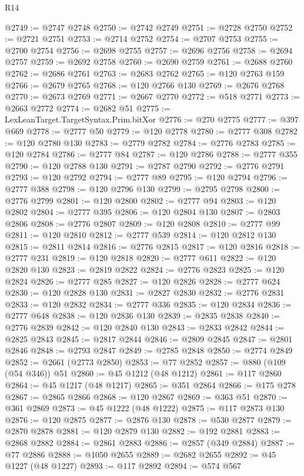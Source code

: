 \begin{lexlean}{R14}
\begin{coremodule}
{{{{{{{{{{{{{{{{{{{{{{{{{{{{{{{{{{{{{{{{{{{{{{{{{{{{{{{{{{{{{{{{{{{{{{{{{{{{{{{{{{{{{{{{{{{{{{{{{{{{{{{{{{@2749 := @2747 @2748
@2750 := @2742 @2749
@2751 := @2728 @2750
@2752 := @2721 @2751
@2753 := @2714 @2752
@2754 := @2707 @2753
@2755 := @2700 @2754
@2756 := @2698 @2755
@2757 := @2696 @2756
@2758 := @2694 @2757
@2759 := @2692 @2758
@2760 := @2690 @2759
@2761 := @2688 @2760
@2762 := @2686 @2761
@2763 := @2683 @2762
@2765 := @120 @2763 @159
@2766 := @2679 @2765
@2768 := @120 @2766 @130
@2769 := @2676 @2768
@2770 := @2673 @2769
@2771 := @2667 @2770
@2772 := @518 @2771
@2773 := @2663 @2772
@2774 := @2682 @51
@2775 := LexLeanTarget.TargetSyntax.Prim.bitXor
@2776 := @270 @2775
@2777 := @397 @669
@2778 := @2777 @50
@2779 := @120 @2778
@2780 := @2777 @308
@2782 := @120 @2780 @130
@2783 := @2779 @2782
@2784 := @2776 @2783
@2785 := @120 @2784
@2786 := @2777 @84
@2787 := @120 @2786
@2788 := @2777 @355
@2790 := @120 @2788 @130
@2791 := @2787 @2790
@2792 := @2776 @2791
@2793 := @120 @2792
@2794 := @2777 @89
@2795 := @120 @2794
@2796 := @2777 @388
@2798 := @120 @2796 @130
@2799 := @2795 @2798
@2800 := @2776 @2799
@2801 := @120 @2800
@2802 := @2777 @94
@2803 := @120 @2802
@2804 := @2777 @395
@2806 := @120 @2804 @130
@2807 := @2803 @2806
@2808 := @2776 @2807
@2809 := @120 @2808
@2810 := @2777 @99
@2811 := @120 @2810
@2812 := @2777 @539
@2814 := @120 @2812 @130
@2815 := @2811 @2814
@2816 := @2776 @2815
@2817 := @120 @2816
@2818 := @2777 @231
@2819 := @120 @2818
@2820 := @2777 @611
@2822 := @120 @2820 @130
@2823 := @2819 @2822
@2824 := @2776 @2823
@2825 := @120 @2824
@2826 := @2777 @285
@2827 := @120 @2826
@2828 := @2777 @624
@2830 := @120 @2828 @130
@2831 := @2827 @2830
@2832 := @2776 @2831
@2833 := @120 @2832
@2834 := @2777 @336
@2835 := @120 @2834
@2836 := @2777 @648
@2838 := @120 @2836 @130
@2839 := @2835 @2838
@2840 := @2776 @2839
@2842 := @120 @2840 @130
@2843 := @2833 @2842
@2844 := @2825 @2843
@2845 := @2817 @2844
@2846 := @2809 @2845
@2847 := @2801 @2846
@2848 := @2793 @2847
@2849 := @2785 @2848
@2850 := @2774 @2849
@2852 := @2661 (@2773 @2850)
@2853 := @77 @2852
@2857 := @880 (@109 (@54 @346)) @51
@2860 := @45 @1212 (@48 @1212)
@2861 := @117 @2860
@2864 := @45 @1217 (@48 @1217)
@2865 := @351 @2864
@2866 := @175 @278
@2867 := @2865 @2866
@2868 := @120 @2867
@2869 := @363 @51
@2870 := @361 @2869
@2873 := @45 @1222 (@48 @1222)
@2875 := @117 @2873 @130
@2876 := @120 @2875
@2877 := @2876 @130
@2878 := @530 @2877
@2879 := @2870 @2878
@2881 := @120 @2879 @130
@2882 := @192 @2881
@2883 := @2868 @2882
@2884 := @2861 @2883
@2886 := @2857 (@349 @2884)
@2887 := @77 @2886
@2888 := @1050 @2655
@2889 := @2682 @2655
@2892 := @45 @1227 (@48 @1227)
@2893 := @117 @2892
@2894 := @574 @567
}}}}}}}}}}}}}}}}}}}}}}}}}}}}}}}}}}}}}}}}}}}}}}}}}}}}}}}}}}}}}}}}}}}}}}}}}}}}}}}}}}}}}}}}}}}}}}}}}}}}}}}}}}
\end{coremodule}
\end{lexlean}
